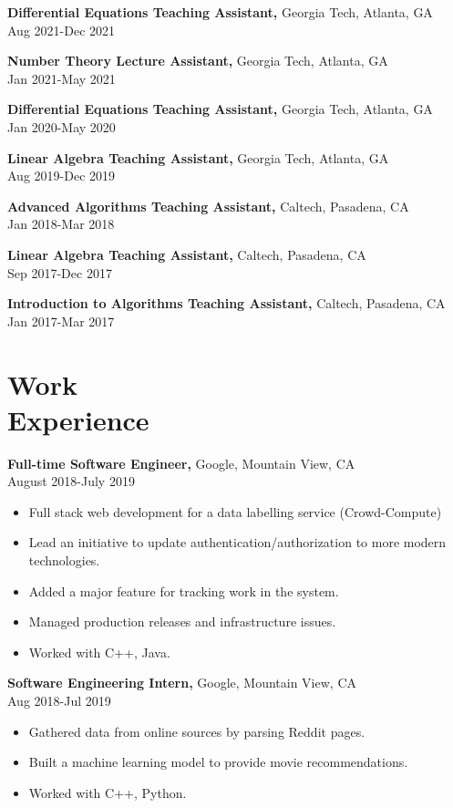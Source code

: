 \documentclass[margin]{res}
\begin{document}
\begin{resume}
{\bf Differential Equations Teaching Assistant,} Georgia Tech, Atlanta, GA \\ Aug 2021-Dec 2021

{\bf Number Theory Lecture Assistant,} Georgia Tech, Atlanta, GA \\ Jan 2021-May 2021

{\bf Differential Equations Teaching Assistant,} Georgia Tech, Atlanta, GA \\ Jan 2020-May 2020

{\bf Linear Algebra Teaching Assistant,} Georgia Tech, Atlanta, GA \\ Aug 2019-Dec 2019

{\bf Advanced Algorithms Teaching Assistant,} Caltech, Pasadena, CA \\ Jan 2018-Mar 2018

{\bf Linear Algebra Teaching Assistant,} Caltech, Pasadena, CA \\ Sep 2017-Dec 2017

{\bf Introduction to Algorithms Teaching Assistant,} Caltech, Pasadena, CA \\ Jan 2017-Mar 2017

 \section{Work\\ Experience}
 {\bf Full-time Software Engineer,} Google, Mountain View, CA \\ August 2018-July 2019
 \begin{itemize} \itemsep -2pt  %
 \item Full stack web development for a data labelling service (Crowd-Compute)
 \item Lead an initiative to update authentication/authorization to more modern technologies.
 \item Added a major feature for tracking work in the system.
 \item Managed production releases and infrastructure issues.
 \item Worked with C++, Java.
 \end{itemize}
 
{\bf Software Engineering Intern,} Google, Mountain View, CA \\ Aug 2018-Jul 2019
\begin{itemize} \itemsep -2pt %
\item Gathered data from online sources by parsing Reddit pages.
\item Built a machine learning model to provide movie recommendations.
\item Worked with C++, Python.
\end{itemize}

\end{resume} 
\end{document}
